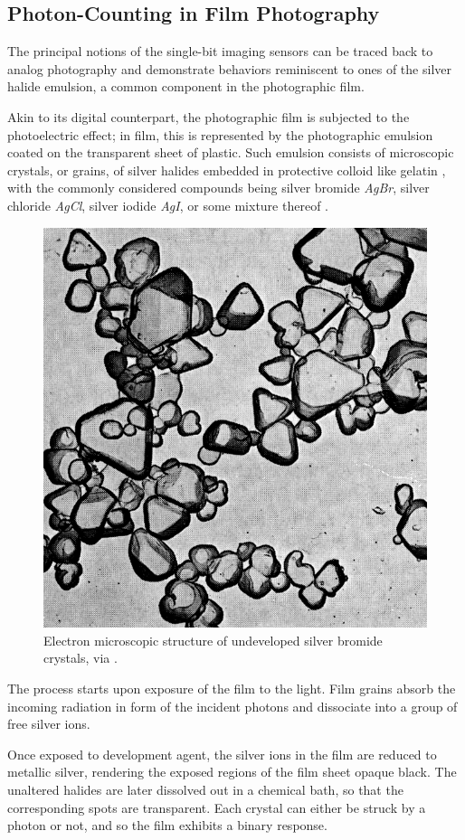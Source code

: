 \subsection{Photon-Counting in Film Photography}

The principal notions of the single-bit imaging sensors can be traced back to analog photography and demonstrate behaviors reminiscent to ones of the silver halide emulsion, a common component in the photographic film. 

Akin to its digital counterpart, the photographic film is subjected to the photoelectric effect; in film, this is represented by the photographic emulsion coated on the transparent sheet of plastic. Such emulsion consists of microscopic crystals, or grains, of silver halides embedded in protective colloid like gelatin \cite{Carroll1980}, with the commonly considered compounds being silver bromide \textit{AgBr}, silver chloride \textit{AgCl}, silver iodide \textit{AgI}, or some mixture thereof \cite{Schroeder1981}.
\begin{figure}[h]
  \centering
  \includegraphics[width=0.5\linewidth]{imgs/film/silver.jpg}
  \caption{Electron microscopic structure of undeveloped silver bromide crystals, via \cite{AgfaABC}.}
  \label{fig:silverbromide}
\end{figure}

The process starts upon exposure of the film to the light. Film grains absorb the incoming radiation in form of the incident photons and dissociate into a group of free silver ions. 

Once exposed to development agent, the silver ions in the film are reduced to metallic silver, rendering the exposed regions of the film sheet opaque black. The unaltered halides are later dissolved out in a chemical bath, so that the corresponding spots are transparent. Each crystal can either be struck by a photon or not, and so the film exhibits a binary response. 

